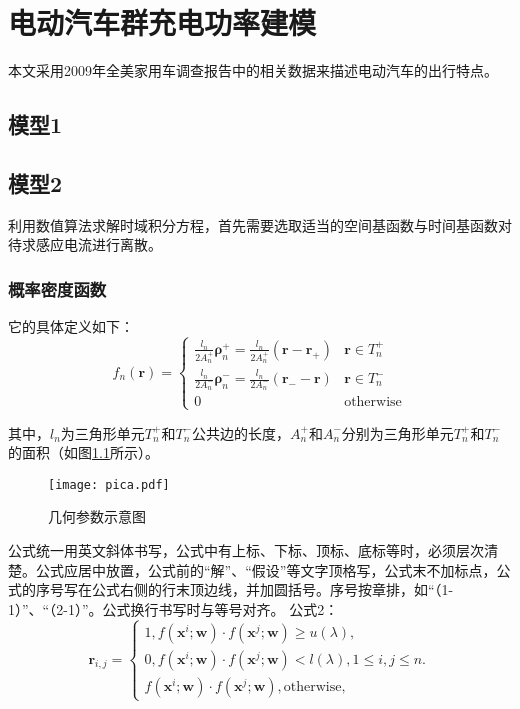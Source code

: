 \chapter{电动汽车群充电功率建模}
本文采用2009年全美家用车调查报告中的相关数据来描述电动汽车的出行特点。

\section{模型1}

\section{模型2}
利用数值算法求解时域积分方程，首先需要选取适当的空间基函数与时间基函数对待求感应电流进行离散。

\subsection{概率密度函数}
它的具体定义如下：
\begin{equation}
f_n(\bm{r})=
\begin{cases}
\frac{l_n}{2A_n^+}\bm{\rho}_n^+=\frac{l_n}{2A_n^+}(\bm{r}-\bm{r}_+)&\bm{r}\in T_n^+\\
\frac{l_n}{2A_n^-}\bm{\rho}_n^-=\frac{l_n}{2A_n^-}(\bm{r}_--\bm{r})&\bm{r}\in T_n^-\\
0&\text{otherwise}
\end{cases}
\end{equation}

其中，$l_n$为三角形单元$T_n^+$和$T_n^-$公共边的长度，$A_n^+$和$A_n^-$分别为三角形单元$T_n^+$和$T_n^-$的面积（如图\ref{pica}所示）。

\begin{figure}[h]
	\texttt{[image: pica.pdf]}
	\caption{几何参数示意图}
	\label{pica}
\end{figure}

公式统一用英文斜体书写，公式中有上标、下标、顶标、底标等时，必须层次清楚。公式应居中放置，公式前的“解”、“假设”等文字顶格写，公式末不加标点，公式的序号写在公式右侧的行末顶边线，并加圆括号。序号按章排，如“（1-1）”、“（2-1）”。公式换行书写时与等号对齐。
公式2：
\begin{equation}
\label{latent_binary_variable}
\bm{r}_{i,j}=
\begin{cases}
1,f(\bm{x}^{i};\bm{w})\cdot f(\bm{x}^{j};\bm{w})\geq u(\lambda),\\
0,f(\bm{x}^{i};\bm{w})\cdot f(\bm{x}^{j};\bm{w})< l(\lambda), 1\leq i,j\leq n.\\
f(\bm{x}^{i};\bm{w})\cdot f(\bm{x}^{j};\bm{w}),\text{otherwise},
\end{cases}
\end{equation}



